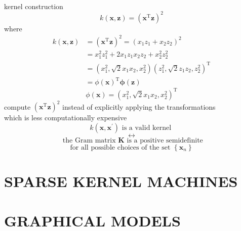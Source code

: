 \documentclass{article}
\begin{document}
	\pagebreak
	
	${}$\\
	kernel construction
	$$
	k(\mathbf{x}, \mathbf{z})=\left(\mathbf{x}^{\mathrm{T}} \mathbf{z}\right)^{2}
	$$
	where 
	$$
	\begin{aligned}
	k(\mathbf{x}, \mathbf{z}) &=\left(\mathbf{x}^{\mathrm{T}} \mathbf{z}\right)^{2}=\left(x_{1} z_{1}+x_{2} z_{2}\right)^{2} \\
	&=x_{1}^{2} z_{1}^{2}+2 x_{1} z_{1} x_{2} z_{2}+x_{2}^{2} z_{2}^{2} \\
	&=\left(x_{1}^{2}, \sqrt{2} x_{1} x_{2}, x_{2}^{2}\right)\left(z_{1}^{2}, \sqrt{2} z_{1} z_{2}, z_{2}^{2}\right)^{\mathrm{T}} \\
	&=\phi(\mathbf{x})^{\mathrm{T}} \boldsymbol{\phi}(\mathbf{z})
	\end{aligned}
	$$
	$$
	\phi(\mathbf{x})=\left(x_{1}^{2}, \sqrt{2} x_{1} x_{2}, x_{2}^{2}\right)^{\mathrm{T}}
	$$
	compute $\left(\mathbf{x}^{\mathrm{T}} \mathbf{z}\right)^{2}$ instead of explicitly applying the transformations\\
	which is less computationally expensive 
	$$
	k\left(\mathbf{x}, \mathbf{x}^{\prime}\right) \text { is a valid kernel }
	$$
	$$
	\leftrightarrow
	$$
	$$
	\text { the Gram matrix } \mathbf{K}\text { is a positive semidefinite}
	$$
	$$
	\text{for all possible choices of the set }\left\{\mathbf{x}_{n}\right\}
	$$
	
	\pagebreak
	\section{SPARSE KERNEL MACHINES}
	
	\pagebreak
	\section{GRAPHICAL MODELS}
	
	\pagebreak
\end{document}
